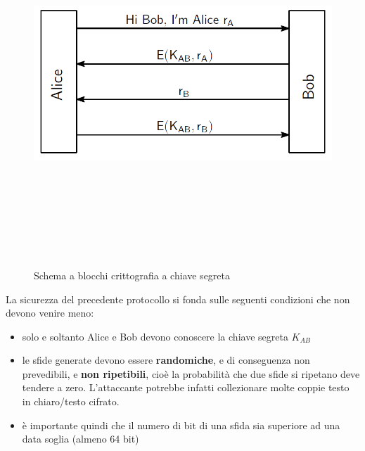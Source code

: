 \begin{figure}[htbp]
	\centering%
	\subfigure%
	{\includegraphics[height=13cm, width=13cm, keepaspectratio]{Immagini/Capitolo2/strong_auth_secret.png}}
	\caption{Schema a blocchi crittografia a chiave segreta \label{fig:strong_auth_sec}} 	
\end{figure}
La sicurezza del precedente protocollo si fonda sulle seguenti condizioni che non devono venire meno:
\begin{itemize}
  \item solo e soltanto Alice e Bob devono conoscere la chiave segreta $K_{AB}$
  \item le sfide generate devono essere \textbf{randomiche}, e di conseguenza non prevedibili, e \textbf{non ripetibili}, cioè la probabilità che due sfide si ripetano deve tendere a zero. L'attaccante potrebbe infatti collezionare molte coppie testo in chiaro/testo cifrato.
  \item è importante quindi che il numero di bit di una sfida sia superiore ad una data soglia (almeno 64 bit)
\end{itemize}

